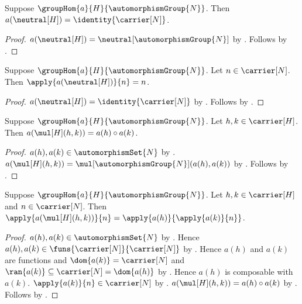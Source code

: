 \begin{proposition}\label{semidirect_action_neutral_graph}
    Suppose $\groupHom{a}{H}{\automorphismGroup{N}}$.
    Then $a(\neutral[H])=\identity{\carrier[N]}$.
\end{proposition}
\begin{proof}
    $a(\neutral[H])=\neutral[\automorphismGroup{N}]$ by
        .
    Follows by .
\end{proof}

\begin{proposition}\label{semidirect_action_neutral}
    Suppose $\groupHom{a}{H}{\automorphismGroup{N}}$.
    Let $n\in\carrier[N]$.
    Then $\apply{a(\neutral[H])}{n}=n$.
\end{proposition}
\begin{proof}
    $a(\neutral[H])=\identity{\carrier[N]}$ by
        .
    Follows by .
\end{proof}

\begin{proposition}\label{semidirect_action_mul_graph}
    Suppose $\groupHom{a}{H}{\automorphismGroup{N}}$.
    Let $h,k\in\carrier[H]$.
    Then $a(\mul[H](h,k))=a(h)\circ a(k)$.
\end{proposition}
\begin{proof}
    $a(h),a(k)\in\automorphismSet{N}$ by
        .
    $a(\mul[H](h,k))=
        \mul[\automorphismGroup{N}](a(h),a(k))$ by
        .
    Follows by .
\end{proof}

\begin{proposition}\label{semidirect_action_mul}
    Suppose $\groupHom{a}{H}{\automorphismGroup{N}}$.
    Let $h,k\in\carrier[H]$ and $n\in\carrier[N]$.
    Then
        $\apply{a(\mul[H](h,k))}{n}=
            \apply{a(h)}{\apply{a(k)}{n}}$.
\end{proposition}
\begin{proof}
    $a(h),a(k)\in\automorphismSet{N}$ by
        .
    Hence $a(h),a(k)\in\funs{\carrier[N]}{\carrier[N]}$ by
        .
    Hence $a(h)$ and $a(k)$ are functions and
        $\dom{a(k)}=\carrier[N]$ and
        $\ran{a(k)}\subseteq\carrier[N]=\dom{a(h)}$ by
        .
    Hence $a(h)$ is composable with $a(k)$.
    $\apply{a(k)}{n}\in\carrier[N]$ by
        .
    $a(\mul[H](h,k))=a(h)\circ a(k)$ by
        .
    Follows by .
\end{proof}

